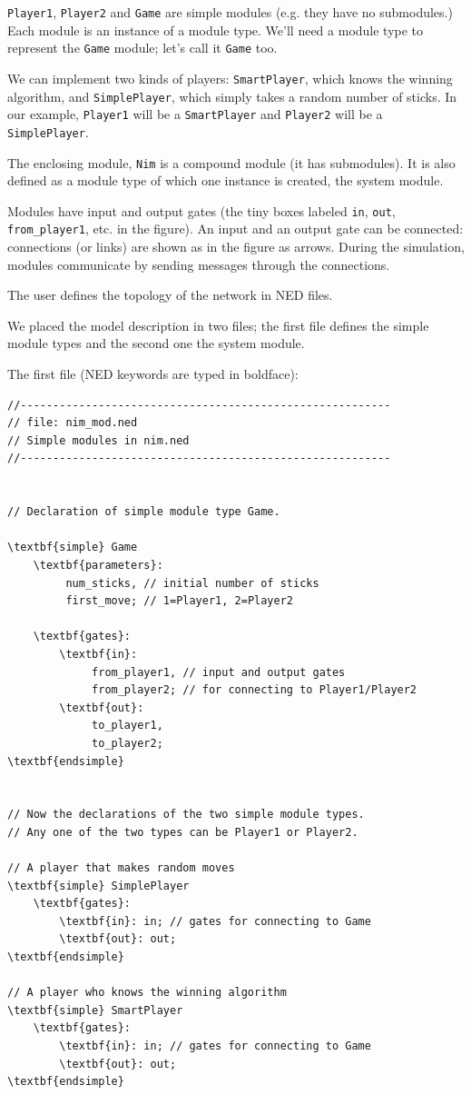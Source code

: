\texttt{Player1}, \texttt{Player2} and \texttt{Game} are simple
modules (e.g. they have no submodules.) Each module is an instance of
a module type. We'll need a module type to represent the \texttt{Game} module;
let's call it \texttt{Game} too.

We can implement two kinds of players: \texttt{SmartPlayer}, which knows
the winning algorithm, and \texttt{SimplePlayer}, which simply takes a
random number of sticks. In our example, \texttt{Player1} will be a \texttt{SmartPlayer}
and \texttt{Player2} will be a \texttt{SimplePlayer}.

The enclosing module, \texttt{Nim} is a compound module (it has submodules).
It is also defined as a module type of which one instance is
created, the system module.

Modules have input and output gates (the tiny boxes
labeled \texttt{in}, \texttt{out}, \texttt{from\_player1}, etc. in the
figure). An input and an output gate can be connected: connections (or
links) are shown as in the figure as arrows.  During the simulation,
modules communicate by sending messages through the connections.


The user defines the topology of the network in NED files.


We placed the model description in two files; the first file
defines the simple module types and the second one the system
module.

The first file (NED keywords are typed in boldface):

\begin{Verbatim}[commandchars=\\\{\}]
//---------------------------------------------------------
// file: nim_mod.ned
// Simple modules in nim.ned
//---------------------------------------------------------


// Declaration of simple module type Game.

\textbf{simple} Game
    \textbf{parameters}:
         num_sticks, // initial number of sticks
         first_move; // 1=Player1, 2=Player2

    \textbf{gates}:
        \textbf{in}:
             from_player1, // input and output gates
             from_player2; // for connecting to Player1/Player2
        \textbf{out}:
             to_player1,
             to_player2;
\textbf{endsimple}


// Now the declarations of the two simple module types.
// Any one of the two types can be Player1 or Player2.

// A player that makes random moves
\textbf{simple} SimplePlayer
    \textbf{gates}:
        \textbf{in}: in; // gates for connecting to Game
        \textbf{out}: out;
\textbf{endsimple}

// A player who knows the winning algorithm
\textbf{simple} SmartPlayer
    \textbf{gates}:
        \textbf{in}: in; // gates for connecting to Game
        \textbf{out}: out;
\textbf{endsimple}
\end{Verbatim}

